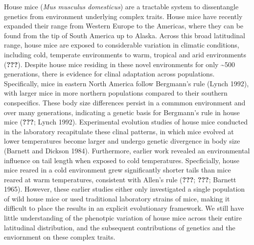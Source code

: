 \documentclass[]{article}
\begin{document}
House mice (\emph{Mus musculus domesticus}) are a tractable system to
dissentangle genetics from environment underlying complex traits. House
mice have recently expanded their range from Western Europe to the
Americas, where they can be found from the tip of South America up to
Alaska. Across this broad latitudinal range, house mice are exposed to
considerable variation in climatic conditions, including cold, temperate
environments to warm, tropical and arid environments ({\textbf{???}}).
Despite house mice residing in these novel environments for only
\textasciitilde{}500 generations, there is evidence for clinal
adaptation across populations. Specifically, mice in eastern North
America follow Bergmann's rule (Lynch 1992), with larger mice in more
northern populations compared to their southern conspecifics. These body
size differences persist in a commmon environment and over many
generations, indicating a genetic basis for Bergmann's rule in house
mice ({\textbf{???}}; Lynch 1992). Experimental evolution studies of
house mice conducted in the laboratory recapitulate these clinal
patterns, in which mice evolved at lower temperatures become larger and
undergo genetic divergence in body size (Barnett and Dickson 1984).
Furthermore, earlier work revealed an environmental influence on tail
length when exposed to cold temperatures. Specficially, house mice
reared in a cold environment grew significantly shorter tails than mice
reared at warm temperatures, consistent with Allen's rule
({\textbf{???}}; {\textbf{???}}; Barnett 1965). However, these earlier
studies either only investigated a single population of wild house mice
or used traditional laboratory strains of mice, making it difficult to
place the results in an explicit evolutionary framework. We still have
little understanding of the phenotpic variation of house mice across
their entire latitudinal distribution, and the subsequent contributions
of genetics and the enviornment on these complex traits.
\end{document}
